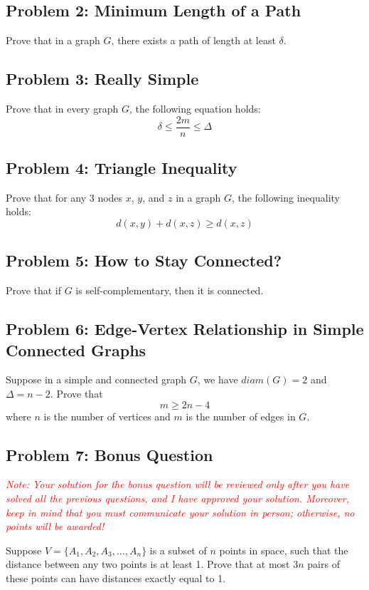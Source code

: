 \documentclass{article}
\begin{document}
\subsection*{Problem 2: Minimum Length of a Path}
Prove that in a graph $G$, there exists a path of length at least $\delta$.

\subsection*{Problem 3: Really Simple}
Prove that in every graph $G$, the following equation holds:
\begin{equation*}
\delta \le \frac{2m}{n} \le \Delta
\end{equation*}

\subsection*{Problem 4: Triangle Inequality}
Prove that for any 3 nodes $x$, $y$, and $z$ in a graph $G$, the following inequality holds:
\begin{equation*}
d(x,y) + d(x,z) \ge d(x,z)
\end{equation*}

\subsection*{Problem 5: How to Stay Connected?}
Prove that if $G$ is self-complementary, then it is connected.

\subsection*{Problem 6: Edge-Vertex Relationship in Simple Connected Graphs}
Suppose in a simple and connected graph $G$, we have $diam(G) = 2$ and $\Delta = n - 2$. Prove that
\begin{equation*}
m \ge 2n - 4
\end{equation*}
where $n$ is the number of vertices and $m$ is the number of edges in $G$.

\subsection*{Problem 7: Bonus Question}
\textcolor{red}{\textit{Note: Your solution for the bonus question will be reviewed only after you have solved all the previous questions, and I have approved your solution. Moreover, keep in mind that you must communicate your solution in person; otherwise, no points will be awarded!}}

Suppose $V = \{A_1, A_2, A_3, \ldots, A_n\}$ is a subset of $n$ points in space, such that the distance between any two points is at least 1. Prove that at most $3n$ pairs of these points can have distances exactly equal to 1.
\end{document}

